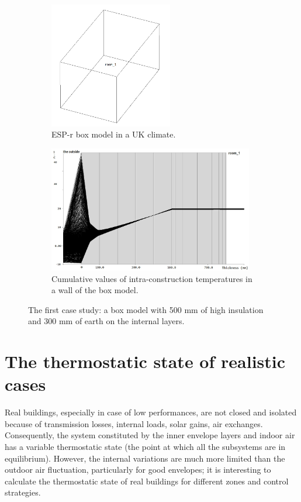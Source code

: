 \documentclass[10pt]{extarticle} %
\begin{document}
 
\begin{figure}[h]

\begin{subfigure}{0.35\textwidth}
\includegraphics[width=0.95\linewidth, height=5.5cm]{images/Dead02_boxModel.png} 
\caption{ESP-r box model in a UK climate.}
\label{fig:esprmodel}
\end{subfigure}
\begin{subfigure}{0.65\textwidth}
\includegraphics[width=0.95\linewidth, height=5.5cm]{images/01Feb_28Feb_Wall1_dead02_krita.jpg}
\caption{Cumulative values of intra-construction temperatures in a wall of the box model.}
\label{fig:constructionelements}
\end{subfigure}

\caption{The first case study: a box model with 500 mm of high  insulation and 300 mm of earth on the internal layers.}
\label{fig:casestudy}
\end{figure}





\section{The thermostatic state of realistic cases} \label{subsec:moreComplex}

Real buildings, especially in case of low performances, are not closed and isolated because of transmission losses, internal loads, solar gains, air exchanges. Consequently, the system constituted by the inner envelope layers and indoor air has a variable thermostatic state (the point at which all the subsystems are in equilibrium). However, the internal variations are much more limited than the outdoor air fluctuation, particularly for good envelopes; it is interesting to calculate the thermostatic state of real buildings for different zones and control strategies. 
\end{document}
